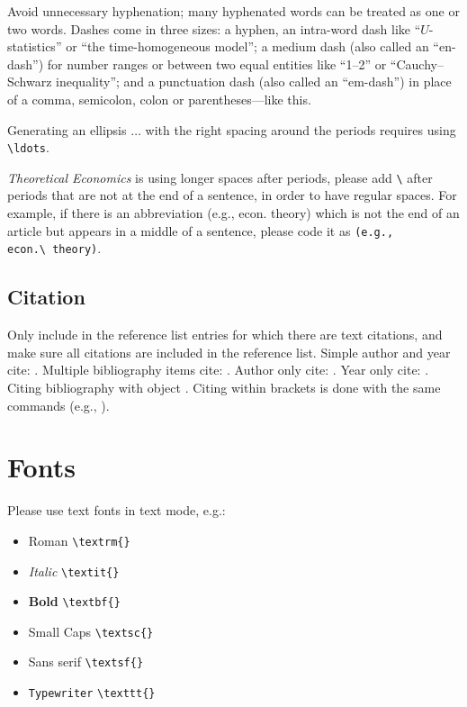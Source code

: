 \documentclass[qe,nameyear,draft]{econsocart}
\theoremstyle{plain}
\begin{document}
Avoid unnecessary hyphenation; many hyphenated words can be treated as one or two words.
Dashes come in three sizes: a hyphen, an intra-word dash like ``$U$-statistics'' or ``the time-homogeneous model'';
a medium dash (also called an ``en-dash'') for number ranges or between two equal entities like ``1--2'' or ``Cauchy--Schwarz inequality'';
and a punctuation dash (also called an ``em-dash'') in place of a comma, semicolon,
colon or parentheses---like this.

Generating an ellipsis $\ldots$ with the right spacing
around the periods requires using \texttt{{\textbackslash}ldots}.

\textit{Theoretical Economics} is using longer spaces after periods, please add \texttt{{\textbackslash}} after periods that are not at the end of a sentence, in order to have regular spaces. For example, if there is an abbreviation (e.g., econ. theory) which is not the end of an article but appears in a middle of a sentence, please code it as \texttt{(e.g., econ.{\textbackslash}~theory)}.

\subsection{Citation}

Only include in the reference list entries for which there are text citations,
and make sure all citations are included in the reference list.
Simple author and year cite: \citet{b1}.
Multiple bibliography items cite: \citet{b2, b3, b4, b5}.
Author only cite: \citet{b4}.
Year only cite: \citet{b4}. Citing bibliography with object \citet{b1}. Citing within brackets is done with the same commands (e.g., \citet{b2, b3, b4}).

\section{Fonts}

Please use text fonts in text mode, e.g.:

\begin{itemize}
\item Roman \texttt{{\textbackslash}textrm\{\}}
\item \textit{Italic} \texttt{{\textbackslash}textit\{\}}
\item \textbf{Bold} \texttt{{\textbackslash}textbf\{\}}
\item Small Caps \texttt{{\textbackslash}textsc\{\}}
\item Sans serif \texttt{{\textbackslash}textsf\{\}}
\item \texttt{Typewriter} \texttt{{\textbackslash}texttt\{\}}
\end{itemize}
\end{document}

